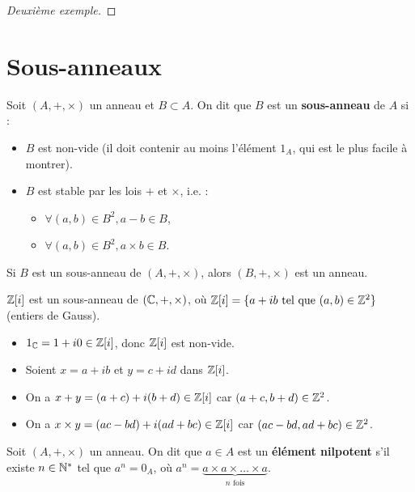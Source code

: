 \documentclass[12pt, a4paper]{report}
\begin{document}
\begin{proof}[Deuxième exemple]
    
\end{proof}

\section{Sous-anneaux}

\begin{definition}
    Soit $(A,+,\times)$ un anneau et $B \subset A$. On dit que $B$ est un \textbf{sous-anneau} de $A$ si :
    \begin{itemize}
        \item $B$ est non-vide (il doit contenir au moins l'élément $1_A$, qui est le plus facile à montrer).
        \item $B$ est stable par les lois $+$ et $\times$, i.e. :
        \begin{itemize}
            \item $\forall (a,b) \in B^2, a - b \in B$,
            \item $\forall (a,b) \in B^2, a \times b \in B$.
        \end{itemize}
    \end{itemize}
\end{definition}

\begin{remark}
    Si $B$ est un sous-anneau de $(A,+,\times)$, alors $(B,+,\times)$ est un anneau.
\end{remark}

\begin{example}
    $\mathbb{Z}[i]$ est un sous-anneau de $(\mathbb{C},+,\times)$, où $\mathbb{Z}[i] = \{a + ib \text{ tel que } (a,b) \in \mathbb{Z}^2\}$ (entiers de Gauss).
    \begin{itemize}
        \item $1_{\mathbb{C}} = 1 + i0 \in \mathbb{Z}[i]$, donc $\mathbb{Z}[i]$ est non-vide.
        \item Soient $x=a+ib$ et $y=c+id$ dans $\mathbb{Z}[i]$.
        \item On a $x+y = (a+c) + i(b+d) \in \mathbb{Z}[i]$ car $(a+c,b+d) \in \mathbb{Z}^2$.
        \item On a $x \times y = (ac - bd) + i(ad + bc) \in \mathbb{Z}[i]$ car $(ac - bd, ad + bc) \in \mathbb{Z}^2$.
    \end{itemize}
\end{example}

\begin{definition}
    Soit $(A,+,\times)$ un anneau. On dit que $a \in A$ est un \textbf{élément nilpotent} s'il existe $n \in \mathbb{N}^*$ tel que $a^n = 0_A$, où $a^n = \underbrace{a \times a \times \ldots \times a}_{n \text{ fois}}$.
\end{definition}
\end{document}
